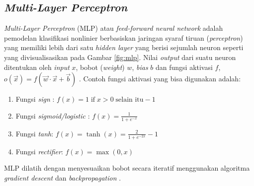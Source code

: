 
\subsection{\textit{Multi-Layer Perceptron}}

\textit{Multi-Layer Perceptron} (MLP) atau \textit{feed-forward neural network} adalah pemodelan klasifikasi nonlinier berbasiskan jaringan syaraf tiruan (\textit{perceptron}) yang memiliki lebih dari satu \textit{hidden layer} yang berisi sejumlah neuron \citep{theodoridis2015machine} seperti yang divisualisasikan pada Gambar \ref{fig:mlp}. Nilai \textit{output} dari suatu neuron ditentukan oleh \textit{input} $x$, bobot (\textit{weight}) $w$, \textit{bias} $b$ dan fungsi aktivasi $f$, $o(\vec{x}) = f(\vec{w} \cdot \vec{x} + \vec{b})$ \citep{mitchell1997machine}. Contoh fungsi aktivasi yang bisa digunakan \citep{mitchell1997machine} adalah:

\begin{enumerate}
	\item Fungsi \textit{sign} : $ f(x) = 1 \; \textrm{if} \; x > 0 \; \textrm{selain itu} -1 $
	\item Fungsi \textit{sigmoid/logistic} : $ f(x)={\frac {1}{1+e^{-x}}} $
	\item Fungsi \textit{tanh}: $ f(x)=\tanh(x)={\frac {2}{1+e^{-2x}}}-1 $
	\item Fungsi \textit{rectifier}: $ f(x)=\max(0,x)$ \citep{nair2010rectified}
\end{enumerate}

MLP dilatih dengan menyesuaikan bobot secara iteratif menggunakan algoritma \textit{gradient descent} dan \textit{backpropagation} \citep{theodoridis2015machine}.

